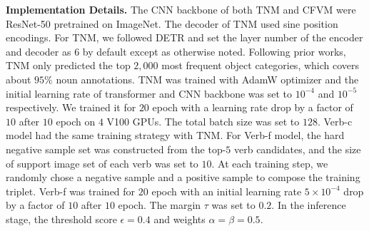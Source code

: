 \documentclass[letterpaper]{article} %
\begin{document}


\noindent \textbf{Implementation Details.}
The CNN backbone of both TNM and CFVM were ResNet-50 pretrained on ImageNet. The decoder of TNM used sine position encodings. For TNM, we followed DETR and set the layer number of the encoder and decoder as $6$ by default except as otherwise noted. Following prior works, TNM only predicted the top $2,000$ most frequent object categories, which covers about $95\%$ noun annotations. TNM was trained with AdamW optimizer and the initial learning rate of transformer and CNN backbone was set to $10^{-4}$ and $10^{-5}$ respectively. We trained it for $20$ epoch with a learning rate drop by a factor of $10$ after $10$ epoch on $4$ V100 GPUs. The total batch size was set to $128$. Verb-c model had the same training strategy with TNM. For Verb-f model, the hard negative sample set was constructed from the top-$5$ verb candidates, and the size of support image set of each verb was set to $10$.
At each training step, we randomly chose a negative sample and a positive sample to compose the training triplet. Verb-f was trained for $20$ epoch with an initial learning rate $5 \times 10^{-4}$ drop by a factor of $10$ after $10$ epoch. The margin $\tau$ was set to $0.2$. In the inference stage, the threshold score $\epsilon=0.4$ and weights $\alpha = \beta = 0.5$.  








\end{document}
